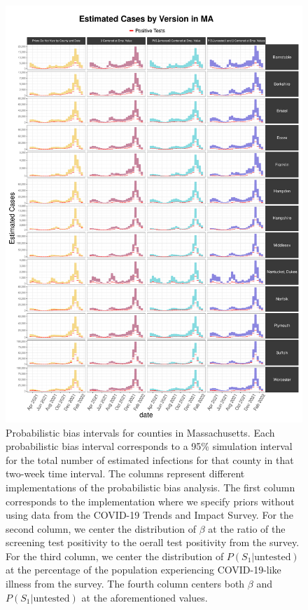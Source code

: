 \documentclass[12pt,twoside]{smiththesis}
\begin{document}
\begin{figure}
\includegraphics[width=1\linewidth]{figure/ma_pb_compared_to_observed} \caption{\label{fig:pb_counts_ma}Probabilistic bias intervals for counties in Massachusetts. Each probabilistic bias interval corresponds to a 95\% simulation interval for the total number of estimated infections for that county in that two-week time interval. The columns represent different implementations of the probabilistic bias analysis. The first column corresponds to the implementation where we specify priors without using data from the COVID-19 Trends and Impact Survey. For the second column, we center the distribution of $\beta$ at the ratio of the screening test positivity to the oerall test positivity from the survey. For the third column, we center the distribution of $P(S_1|\text{untested})$ at the percentage of the population experiencing COVID-19-like illness from the survey. The fourth column centers both  $\beta$ and $P(S_1|\text{untested})$ at the aforementioned values.}\label{fig:unnamed-chunk-76}
\end{figure}
\end{document}
